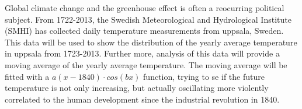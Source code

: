 

Global climate change and the greenhouse effect is often a reocurring political subject. From 1722-2013, the Swedish Meteorological and Hydrological Institute (SMHI) has collected daily temperature measurements from uppsala, Sweden. This data will be used to show the distribution of the yearly average temperature in uppsala from 1723-2013. Further more, analysis of this data will provide a moving average of the yearly average temperature. The moving average will be fitted with a $a(x-1840)\cdot cos(bx)$ function, trying to se if the future temperature is not only increasing, but actually oscillating more violently correlated to the human development since the industrial revolution in 1840.

